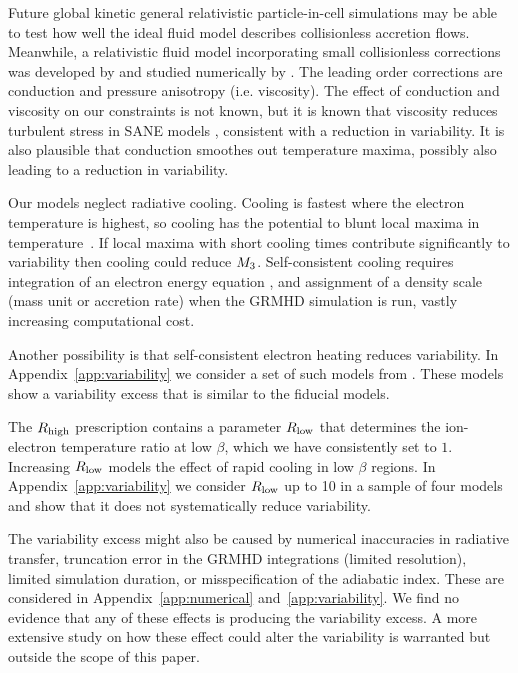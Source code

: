 Future global kinetic general relativistic particle-in-cell simulations may be able to test how well the ideal fluid model describes collisionless accretion flows.
Meanwhile, a relativistic fluid model incorporating small collisionless corrections was developed by \citet{2015ApJ...810..162C} and studied numerically by \citet{2017MNRAS.470.2240F}.
The leading order corrections are conduction and pressure anisotropy (i.e. viscosity).
The effect of conduction and viscosity on our constraints is not known, but it is known that viscosity reduces turbulent stress in SANE models \citep{2017MNRAS.470.2240F}, consistent with a reduction in variability.
It is also plausible that conduction smoothes out temperature maxima, possibly also leading to a reduction in variability.

Our models neglect radiative cooling.
Cooling is fastest where the electron temperature is highest, so cooling has the potential to blunt local maxima in temperature~\citep{2020MNRAS.499.3178Y}.
If local maxima with short cooling times contribute significantly to variability then cooling could reduce $M_{3}$.
Self-consistent cooling requires integration of an electron energy equation \citep[e.g.][]{2015MNRAS.454.1848R}, and assignment of a density scale (mass unit or accretion rate) when the GRMHD simulation is run, vastly increasing computational cost.

Another possibility is that self-consistent electron heating reduces variability.
In Appendix~\ref{app:variability} we consider a set of such models from \citet{2020MNRAS.494.4168D}.
These models show a variability excess that is similar to the fiducial models.

The $R_\mathrm{high}$ prescription contains a parameter $R_\mathrm{low}$ that determines the ion-electron temperature ratio at low $\beta$, which we have consistently set to $1$.
Increasing $R_\mathrm{low}$ models the effect of rapid cooling in low $\beta$ regions.
In Appendix~\ref{app:variability} we consider $R_\mathrm{low}$ up to 10 in a sample of four models and show that it does not systematically reduce variability.

The variability excess might also be caused by numerical inaccuracies in radiative transfer, truncation error in the GRMHD integrations (limited resolution), limited simulation duration, or misspecification of the adiabatic index.
These are considered in Appendix~\ref{app:numerical} and~\ref{app:variability}.
We find no evidence that any of these effects is producing the variability excess.  A more extensive study on how these effect could alter the variability is warranted but
outside the scope of this paper.

